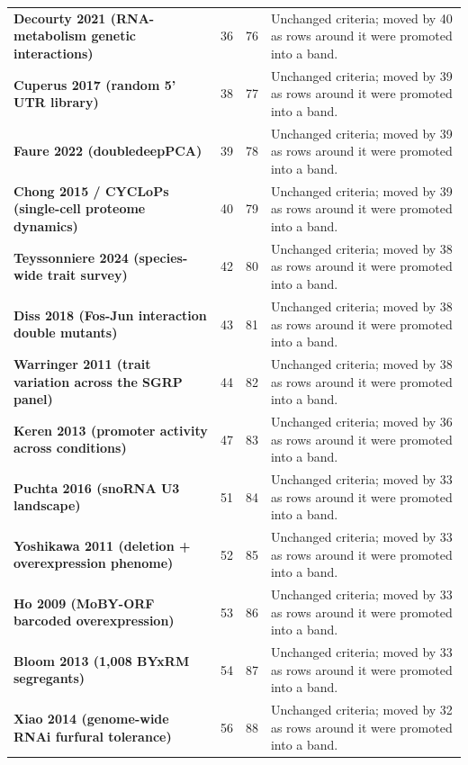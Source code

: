 \begin{longtable}{@{}L{46mm} r@{\hspace{6pt}} r@{\hspace{6pt}} L{104mm}@{}}
\addlinespace[5pt]
\textbf{Decourty 2021 (RNA-metabolism genetic interactions)} & 36 & 76 & Unchanged criteria; moved by 40 as rows around it were promoted into a band. \\
\addlinespace[5pt]
\textbf{Cuperus 2017 (random 5' UTR library)} & 38 & 77 & Unchanged criteria; moved by 39 as rows around it were promoted into a band. \\
\addlinespace[5pt]
\textbf{Faure 2022 (doubledeepPCA)} & 39 & 78 & Unchanged criteria; moved by 39 as rows around it were promoted into a band. \\
\addlinespace[5pt]
\textbf{Chong 2015 / CYCLoPs (single-cell proteome dynamics)} & 40 & 79 & Unchanged criteria; moved by 39 as rows around it were promoted into a band. \\
\addlinespace[5pt]
\textbf{Teyssonniere 2024 (species-wide trait survey)} & 42 & 80 & Unchanged criteria; moved by 38 as rows around it were promoted into a band. \\
\addlinespace[5pt]
\textbf{Diss 2018 (Fos-Jun interaction double mutants)} & 43 & 81 & Unchanged criteria; moved by 38 as rows around it were promoted into a band. \\
\addlinespace[5pt]
\textbf{Warringer 2011 (trait variation across the SGRP panel)} & 44 & 82 & Unchanged criteria; moved by 38 as rows around it were promoted into a band. \\
\addlinespace[5pt]
\textbf{Keren 2013 (promoter activity across conditions)} & 47 & 83 & Unchanged criteria; moved by 36 as rows around it were promoted into a band. \\
\addlinespace[5pt]
\textbf{Puchta 2016 (snoRNA U3 landscape)} & 51 & 84 & Unchanged criteria; moved by 33 as rows around it were promoted into a band. \\
\addlinespace[5pt]
\textbf{Yoshikawa 2011 (deletion + overexpression phenome)} & 52 & 85 & Unchanged criteria; moved by 33 as rows around it were promoted into a band. \\
\addlinespace[5pt]
\textbf{Ho 2009 (MoBY-ORF barcoded overexpression)} & 53 & 86 & Unchanged criteria; moved by 33 as rows around it were promoted into a band. \\
\addlinespace[5pt]
\textbf{Bloom 2013 (1,008 BYxRM segregants)} & 54 & 87 & Unchanged criteria; moved by 33 as rows around it were promoted into a band. \\
\addlinespace[5pt]
\textbf{Xiao 2014 (genome-wide RNAi furfural tolerance)} & 56 & 88 & Unchanged criteria; moved by 32 as rows around it were promoted into a band. \\

\end{longtable}
